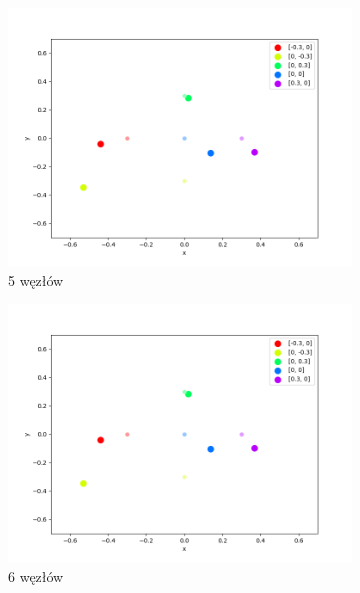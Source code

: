 \begin{figure}[h]
\begin{subfigure}{.5\textwidth}
    \includegraphics[width=\linewidth]{pics/mult_lat_2d_num/positions_3_mean.png}
\caption{5 węzłów}
\label{pic:2d_5_num_mult}
\end{subfigure}%
\begin{subfigure}{.5\textwidth}
    \centering
    \includegraphics[width=\linewidth]{pics/mult_lat_2d_num/positions_3_mean.png}
\caption{6 węzłów}
\label{pic:2d_6_num_mult}
\end{subfigure}
\begin{subfigure}{.5\textwidth}
    \centering

\end{subfigure}
\end{figure}
